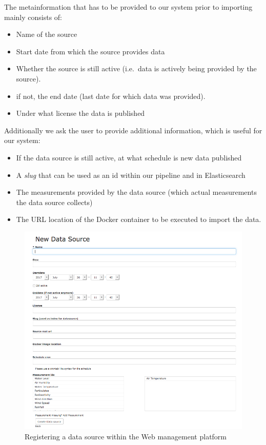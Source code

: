 The metainformation that has to be provided to our system prior to
importing mainly consists of:

\begin{itemize}
\tightlist
\item
  Name of the source
\item
  Start date from which the source provides data
\item
  Whether the source is still active (i.e.~data is actively being
  provided by the source).
\item
  if not, the end date (last date for which data was provided).
\item
  Under what license the data is published
\end{itemize}

Additionally we ask the user to provide additional information, which is
useful for our system:

\begin{itemize}
\tightlist
\item
  If the data source is still active, at what schedule is new data
  published
\item
  A \emph{slug} that can be used as an id within our pipeline and in
  Elasticsearch
\item
  The measurements provided by the data source (which actual
  measurements the data source collects)
\item
  The URL location of the Docker container to be executed to import the
  data.
\end{itemize}

\begin{figure}
\centering
\includegraphics{images/new_datasource.png}
\caption{Registering a data source within the Web management platform}
\end{figure}

